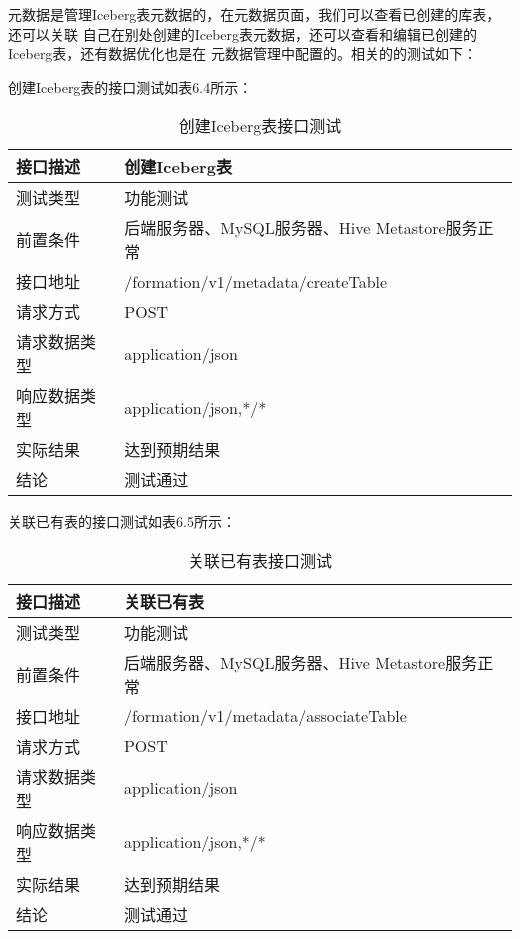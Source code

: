 元数据是管理Iceberg表元数据的，在元数据页面，我们可以查看已创建的库表，还可以关联
自己在别处创建的Iceberg表元数据，还可以查看和编辑已创建的Iceberg表，还有数据优化也是在
元数据管理中配置的。相关的的测试如下：

创建Iceberg表的接口测试如表6.4所示：

\begin{table}[h]
  \centering
  \caption{创建Iceberg表接口测试}
  \label{tab:exampletable}
  \begin{tabular}{ll}
    \toprule
    接口描述         & 创建Iceberg表         \\
    \midrule
    测试类型         & 功能测试         \\
    前置条件         & 后端服务器、MySQL服务器、Hive Metastore服务正常         \\
    接口地址       & /formation/v1/metadata/createTable        \\
    请求方式         & POST      \\
    请求数据类型         & application/json     \\
    响应数据类型         & application/json,*/*           \\
    实际结果         & 达到预期结果           \\
    结论            & 测试通过           \\
    \bottomrule
  \end{tabular}
\end{table}

关联已有表的接口测试如表6.5所示：

\begin{table}[h]
  \centering
  \caption{关联已有表接口测试}
  \label{tab:exampletable}
  \begin{tabular}{ll}
    \toprule
    接口描述         & 关联已有表         \\
    \midrule
    测试类型         & 功能测试         \\
    前置条件         & 后端服务器、MySQL服务器、Hive Metastore服务正常         \\
    接口地址       & /formation/v1/metadata/associateTable        \\
    请求方式         & POST      \\
    请求数据类型         & application/json     \\
    响应数据类型         & application/json,*/*           \\
    实际结果         & 达到预期结果           \\
    结论            & 测试通过           \\
    \bottomrule
  \end{tabular}
\end{table}

